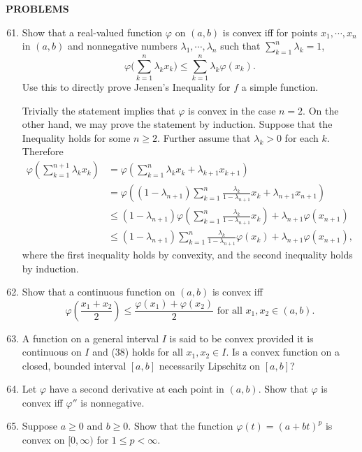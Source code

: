 \begin{center}
	\textbf{PROBLEMS}
\end{center}
\begin{enumerate}
	\setcounter{enumi}{60}
	\item Show that a real-valued function $\varphi$ on $(a,b)$ is convex iff for points $x_1,\cdots,x_n$ in $(a,b)$ and nonnegative numbers $\lambda_1,\cdots,\lambda_n$ such that $\sum_{k=1}^n \lambda_k=1$,
	\[
        \varphi \biggr ( \sum_{k=1}^n \lambda_k x_k \biggl ) \le \sum_{k=1}^n \lambda_k \varphi(x_k).   
    \]
    Use this to directly prove Jensen's Inequality for $f$ a simple function.
    
    Trivially the statement implies that $\varphi$ is convex in the case $n=2$.
    On the other hand, we may prove the statement by induction.
    Suppose that the Inequality holds for some $n\ge 2$. 
    Further assume that $\lambda_k>0$ for each $k$.
    Therefore
    \begin{align*}
        \varphi\left(\sum_{k=1}^{n+1}\lambda_kx_k\right)
        &=\varphi\left(\sum_{k=1}^{n}\lambda_kx_k+\lambda_{k+1}x_{k+1}\right)\\
        &=\varphi\left((1-\lambda_{n+1})\sum_{k=1}^{n}\frac{\lambda_k}{1-\lambda_{n+1}}x_k+\lambda_{n+1}x_{n+1}\right)\\
        &\le(1-\lambda_{n+1})\varphi\left(\sum_{k=1}^{n}\frac{\lambda_k}{1-\lambda_{n+1}}x_k\right)+\lambda_{n+1}\varphi\left(x_{n+1}\right)\\
        &\le(1-\lambda_{n+1})\sum_{k=1}^{n}\frac{\lambda_k}{1-\lambda_{n+1}}\varphi(x_k)+\lambda_{n+1}\varphi\left(x_{n+1}\right),
    \end{align*}
    where the first inequality holds by convexity, and the second inequality holds by induction.
    \item Show that a continuous function on $(a,b)$ is convex iff
    \[
        \varphi(\frac{x_1+x_2}{2})\le\frac{\varphi(x_1)+\varphi(x_2)}{2}\text{ for all }x_1,x_2\in (a,b).  
    \]
    \item A function on a general interval $I$ is said to be convex provided it is continuous on $I$ and (38) holds for all $x_1,x_2\in I$.
    Is a convex function on a closed, bounded interval $[a,b]$ necessarily Lipschitz on $[a,b]$?
    \item Let $\varphi$ have a second derivative at each point in $(a,b)$.
    Show that $\varphi$ is convex iff $\varphi''$ is nonnegative.
    \item Suppose $a\ge 0$ and $b\ge 0$.
    Show that the function $\varphi(t)=(a+bt)^p$ is convex on $[0,\infty)$ for $1\le p < \infty$.

\end{enumerate}
